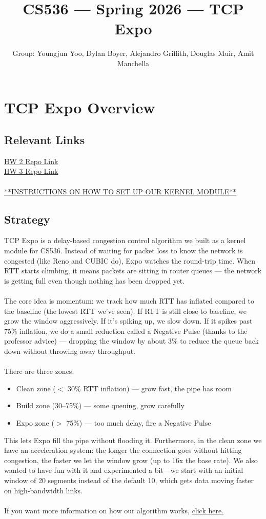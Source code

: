 \documentclass[11pt]{article}
\title{CS536 --- Spring 2026 --- TCP Expo}
\author{Group: Youngjun Yoo, Dylan Boyer, Alejandro Griffith, Douglas Muir, Amit Manchella}
\date{}
\begin{document}
\maketitle
\section{TCP Expo Overview}
\subsection*{Relevant Links}
\href{https://github.com/CS536-Group2026/hw2/tree/main}{HW 2 Repo Link} \\
\href{https://github.com/CS536-Group2026/hw3/tree/main}{HW 3 Repo Link} \\ \\
\href{https://github.com/CS536-Group2026/hw3/blob/main/readme.md#kernel-module-setup}{**INSTRUCTIONS ON HOW TO SET UP OUR KERNEL MODULE**}

\subsection*{Strategy}
TCP Expo is a delay-based congestion control algorithm we built as a kernel module for CS536. Instead of waiting for packet loss to know the network is congested (like Reno and CUBIC do), Expo watches the round-trip time. When RTT starts climbing, it means packets are sitting in router queues — the network is getting full even though nothing has been dropped yet.
\\ \\
The core idea is momentum: we track how much RTT has inflated compared to the baseline (the lowest RTT we've seen). If RTT is still close to baseline, we grow the window aggressively. If it's spiking up, we slow down. If it spikes past 75\% inflation, we do a small reduction called a Negative Pulse (thanks to the professor advice) — dropping the window by about 3\% to reduce the queue back down without throwing away throughput.
\\ \\
There are three zones:
\begin{itemize}
    \item Clean zone ($<$ 30\% RTT inflation) — grow fast, the pipe has room
    \item Build zone (30–75\%) — some queuing, grow carefully
    \item Expo zone ($>$ 75\%) — too much delay, fire a Negative Pulse
\end{itemize}
This lets Expo fill the pipe without flooding it. Furthermore, in the clean zone we have an acceleration system: the longer the connection goes without hitting congestion, the faster we let the window grow (up to 16x the base rate). We also wanted to have fun with it and experimented a bit—we start with an initial window of 20 segments instead of the default 10, which gets data moving faster on high-bandwidth links.
\\ \\
If you want more information on how our algorithm works, \href{https://github.com/CS536-Group2026/hw3/blob/main/explanation.md}{click here.}
\end{document}
